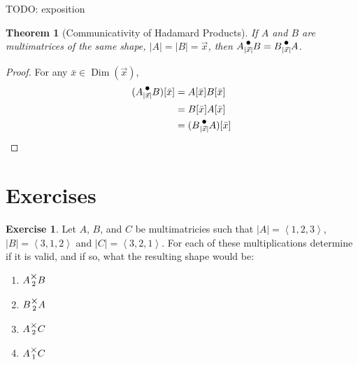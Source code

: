 \documentclass[12pt]{book}
\theoremstyle{plain}
\newtheorem{theorem}{Theorem}[chapter]
\theoremstyle{definition}
\newtheorem{exercise}{Exercise}[chapter]
\theoremstyle{ppart}
\theoremstyle{case}
\theoremstyle{solution}
\DeclareMathOperator{\Dim}{Dim}
\newcommand{\mmult}[1]{\text{\raisebox{1ex}{$\underset{#1}{\times}$}}}
\newcommand{\dmult}[1]{\text{\raisebox{1ex}{$\underset{#1}{\,\bullet\,}$}}}
\begin{document}
TODO: exposition

\begin{theorem}[Communicativity of Hadamard Products]
If $A$ and $B$ are multimatrices of the same shape, $|A| = |B| = \vec{x}$,
then $A \dmult{|\vec{x}|} B = B \dmult{|\vec{x}|} A$.
\end{theorem}
\begin{proof}
For any $\bar{x} \in \Dim(\vec{x})$,
\begin{align*}
(A \dmult{|\vec{x}|} B)[\bar{x}]
  &= A[\bar{x}] B[\bar{x}] \\
  &= B[\bar{x}] A[\bar{x}] \\
  &= (B \dmult{|\vec{x}|} A)[\bar{x}]
\end{align*}
\end{proof}

\section{Exercises}

\begin{exercise}
Let $A$, $B$, and $C$ be multimatricies such that $|A| = \left<1,2,3\right>$,
$|B| = \left<3,1,2\right>$ and $|C| = \left<3,2,1\right>$. For each of these
multiplications determine if it is valid, and if so, what the resulting
shape would be:
\begin{enumerate}
\item $A \mmult{2} B$
\item $B \mmult{2} A$
\item $A \mmult{2} C$
\item $A \mmult{1} C$
\end{enumerate}
\end{exercise}
\end{document}
